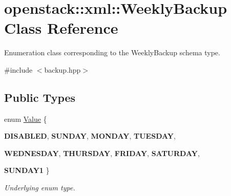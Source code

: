 \hypertarget{classopenstack_1_1xml_1_1WeeklyBackup}{
\section{openstack::xml::WeeklyBackup Class Reference}
\label{classopenstack_1_1xml_1_1WeeklyBackup}
}


Enumeration class corresponding to the WeeklyBackup schema type.  




{\ttfamily \#include $<$backup.hpp$>$}

\subsection*{Public Types}
\begin{DoxyCompactItemize}
\item 
enum \hyperlink{classopenstack_1_1xml_1_1WeeklyBackup_ac41dd439f5277968c6540768c12ddcb0}{Value} \{ \par
{\bfseries DISABLED}, 
{\bfseries SUNDAY}, 
{\bfseries MONDAY}, 
{\bfseries TUESDAY}, 
\par
{\bfseries WEDNESDAY}, 
{\bfseries THURSDAY}, 
{\bfseries FRIDAY}, 
{\bfseries SATURDAY}, 
\par
{\bfseries SUNDAY1}
 \}
\begin{DoxyCompactList}\small\item\em Underlying enum type. \item\end{DoxyCompactList}\end{DoxyCompactItemize}
